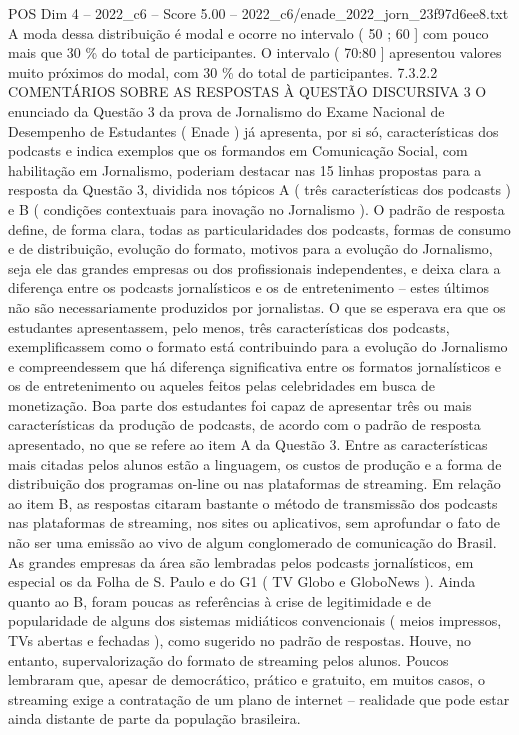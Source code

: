 \begin{textsample}{POS Dim 4 – 2022\_c6 – Score 5.00 – 2022\_c6/enade\_2022\_jorn\_23f97d6ee8.txt}
A moda dessa distribuição é modal e ocorre no intervalo ( 50 ; 60 ] com pouco mais que 30 \% do total de participantes.
O intervalo ( 70:80 ] apresentou valores muito próximos do modal, com 30 \% do total de participantes. 7.3.2.2 COMENTÁRIOS SOBRE AS RESPOSTAS À QUESTÃO DISCURSIVA 3 O enunciado da Questão 3 da prova de Jornalismo do Exame Nacional de Desempenho de Estudantes ( Enade ) já apresenta, por si só, características dos podcasts e indica exemplos que os formandos em Comunicação Social, com habilitação em Jornalismo, poderiam destacar nas 15 linhas propostas para a resposta da Questão 3, dividida nos tópicos A ( três características dos podcasts ) e B ( condições contextuais para inovação no Jornalismo ).
O padrão de resposta define, de forma clara, todas as particularidades dos podcasts, formas de consumo e de distribuição, evolução do formato, motivos para a evolução do Jornalismo, seja ele das grandes empresas ou dos profissionais independentes, e deixa clara a diferença entre os podcasts jornalísticos e os de entretenimento – estes últimos não são necessariamente produzidos por jornalistas.
O que se esperava era que os estudantes apresentassem, pelo menos, três características dos podcasts, exemplificassem como o formato está contribuindo para a evolução do Jornalismo e compreendessem que há diferença significativa entre os formatos jornalísticos e os de entretenimento ou aqueles feitos pelas celebridades em busca de monetização.
Boa parte dos estudantes foi capaz de apresentar três ou mais características da produção de podcasts, de acordo com o padrão de resposta apresentado, no que se refere ao item A da Questão 3.
Entre as características mais citadas pelos alunos estão a linguagem, os custos de produção e a forma de distribuição dos programas on-line ou nas plataformas de streaming.
Em relação ao item B, as respostas citaram bastante o método de transmissão dos podcasts nas plataformas de streaming, nos sites ou aplicativos, sem aprofundar o fato de não ser uma emissão ao vivo de algum conglomerado de comunicação do Brasil.
As grandes empresas da área são lembradas pelos podcasts jornalísticos, em especial os da Folha de S.
Paulo e do G1 ( TV Globo e GloboNews ).
Ainda quanto ao B, foram poucas as referências à crise de legitimidade e de popularidade de alguns dos sistemas midiáticos convencionais ( meios impressos, TVs abertas e fechadas ), como sugerido no padrão de respostas.
Houve, no entanto, supervalorização do formato de streaming pelos alunos.
Poucos lembraram que, apesar de democrático, prático e gratuito, em muitos casos, o streaming exige a contratação de um plano de internet – realidade que pode estar ainda distante de parte da população brasileira.

\end{textsample}
